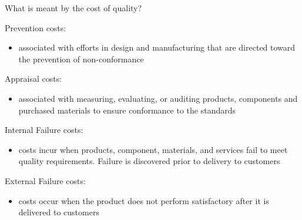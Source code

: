 What is meant by the cost of quality?

    Prevention costs:
        \begin{itemize}
            \item associated with efforts in design and manufacturing that are directed toward the prevention of non-conformance
        \end{itemize}

    Appraisal costs:
        \begin{itemize}
            \item associated with measuring, evaluating, or auditing products, components and purchased materials to ensure conformance to the standards
        \end{itemize}
        
    Internal Failure costs:
        \begin{itemize}
            \item costs incur when products, component, materials, and services fail to meet quality requirements. Failure is discovered prior to delivery to customers
        \end{itemize}
        
    External Failure costs:
        \begin{itemize}
            \item costs occur when the product does not perform satisfactory after it is delivered to customers
        \end{itemize}
